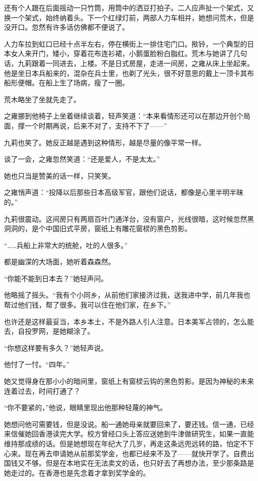 \par 还有个人跟在后面摇动一只竹筒，用筒中的洒豆打拍子。二人应声扯一个架式，又换一个架式，始终纳着头。下一个红绿灯前，两部人力车相并，她想问荒木，但是没开口。忽然有许多话仿佛都不便说了。
\par 人力车拉到虹口已经十点半左右，停在横街上一排住宅门口。揿铃，一个典型的日本女人来开门，矮小，穿着花布连衫裙，小鹅蛋脸粉白脂红。荒木与她讲了几句话，九莉跟着一同进去，上楼。不是日式房屋，走进一间房，之雍从床上坐起来。他是坐日本兵船来的，混杂在兵士里，也剃了光头，很不好意思的戴上一顶卡其布船形便帽。在船上生了场病，瘦了一圈。
\par 荒木略坐了坐就先走了。
\par 之雍挪到他椅子上坐着继续谈着，轻声笑道：“本来看情形还可以在那边开创个局面，撑一个时期再说，后来不对了，支持不下了——”
\par 九莉也笑了。她反正越是遇到这种情形，越是尽量的像平常一样。
\par 谈了一会，之雍忽然笑道：“还是爱人，不是太太。”
\par 她也只当是赞美的话一样，只笑笑。
\par 之雍悄声道：“投降以后那些日本高级军官，跟他们说话，都像是心里半明半昧的。”
\par 九莉很震动。这间房只有两扇百叶门通洋台，没有窗户，光线很暗，这时候忽然黑洞洞的，是个中国旧式平房，窗纸上有雕花窗棂的黑色剪影。
\par “……兵船上非常大的统舱，吐的人很多。”
\par 都是幽深的大场面，她听着森森然。
\par “你能不能到日本去？”她轻声问。
\par 他略摇了摇头。“我有个小同乡，从前他们家接济过我，送我进中学，前几年我也帮过他们钱，帮了很多。我可以住在他们家，在乡下。”
\par 也许还是这样最妥当，本乡本土，不是外路人引人注意。日本美军占领的，怎么能去，自投罗网，是她糊涂了。
\par “你想这样要有多久？”她轻声说。
\par 他忖了一忖。“四年。”
\par 她又觉得身在那小小的暗间里，窗纸上有窗棂云钩的黑色剪影。是因为神秘的未来连着过去，时间打通了？
\par “你不要紧的，”他说，眼睛里现出他那种轻蔑的神气。
\par 她想问他可需要钱，但是没说。船一通她母亲就要回来了，要还钱。信一通，已经来信催她回香港读完大学。校方曾经口头上答应送她到牛津做研究生，如果一直能维持那成绩的话。但是她想现在年纪大了几岁，再走这条远兜远转的路，怕定不下心来。现在再去申请她从前那奖学金，也都已经来不及了——就快开学了。自费出国钱又不够。但是在本地实在无法卖文的话，也只好去了再想办法，至少那条路是她走过的。在香港也是先念着才拿到奖学金的。
